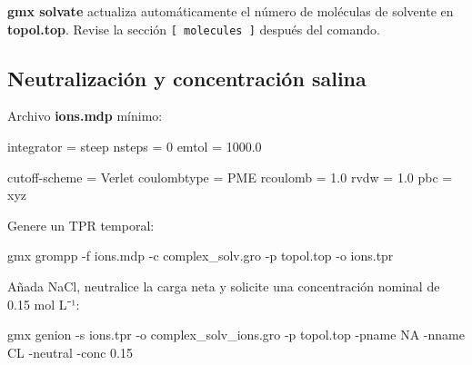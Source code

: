 \documentclass[
  spanish,
  11pt,
  a4paper]{article}
\newenvironment{Shaded}{\begin{snugshade}}{\end{snugshade}}
\newcommand{\AttributeTok}[1]{\textcolor[rgb]{0.13,0.29,0.53}{#1}}
\newcommand{\DataTypeTok}[1]{\textcolor[rgb]{0.13,0.29,0.53}{#1}}
\newcommand{\DecValTok}[1]{\textcolor[rgb]{0.00,0.00,0.81}{#1}}
\newcommand{\ExtensionTok}[1]{#1}
\newcommand{\FloatTok}[1]{\textcolor[rgb]{0.00,0.00,0.81}{#1}}
\newcommand{\NormalTok}[1]{#1}
\newcommand{\OtherTok}[1]{\textcolor[rgb]{0.56,0.35,0.01}{#1}}
\newcommand{\StringTok}[1]{\textcolor[rgb]{0.31,0.60,0.02}{#1}}
\begin{document}
\textbf{gmx solvate} actualiza automáticamente el número de moléculas de
solvente en \textbf{topol.top}. Revise la sección
\texttt{{[}\ molecules\ {]}} después del comando.

\subsection{Neutralización y concentración
salina}\label{neutralizaciuxf3n-y-concentraciuxf3n-salina}

Archivo \textbf{ions.mdp} mínimo:

\begin{Shaded}
\begin{Highlighting}[]
\DataTypeTok{integrator      }\OtherTok{=}\StringTok{ steep}
\DataTypeTok{nsteps          }\OtherTok{=}\StringTok{ }\DecValTok{0}
\DataTypeTok{emtol           }\OtherTok{=}\StringTok{ }\FloatTok{1000.0}

\DataTypeTok{cutoff{-}scheme   }\OtherTok{=}\StringTok{ Verlet}
\DataTypeTok{coulombtype     }\OtherTok{=}\StringTok{ PME}
\DataTypeTok{rcoulomb        }\OtherTok{=}\StringTok{ }\FloatTok{1.0}
\DataTypeTok{rvdw            }\OtherTok{=}\StringTok{ }\FloatTok{1.0}
\DataTypeTok{pbc             }\OtherTok{=}\StringTok{ xyz}
\end{Highlighting}
\end{Shaded}

Genere un TPR temporal:

\begin{Shaded}
\begin{Highlighting}[]
\ExtensionTok{gmx}\NormalTok{ grompp     }\AttributeTok{{-}f}\NormalTok{ ions.mdp     }\AttributeTok{{-}c}\NormalTok{ complex\_solv.gro     }\AttributeTok{{-}p}\NormalTok{ topol.top     }\AttributeTok{{-}o}\NormalTok{ ions.tpr}
\end{Highlighting}
\end{Shaded}

Añada NaCl, neutralice la carga neta y solicite una concentración
nominal de 0.15 mol L⁻¹:

\begin{Shaded}
\begin{Highlighting}[]
\ExtensionTok{gmx}\NormalTok{ genion     }\AttributeTok{{-}s}\NormalTok{ ions.tpr     }\AttributeTok{{-}o}\NormalTok{ complex\_solv\_ions.gro     }\AttributeTok{{-}p}\NormalTok{ topol.top     }\AttributeTok{{-}pname}\NormalTok{ NA     }\AttributeTok{{-}nname}\NormalTok{ CL     }\AttributeTok{{-}neutral}     \AttributeTok{{-}conc}\NormalTok{ 0.15}
\end{Highlighting}
\end{Shaded}
\end{document}
